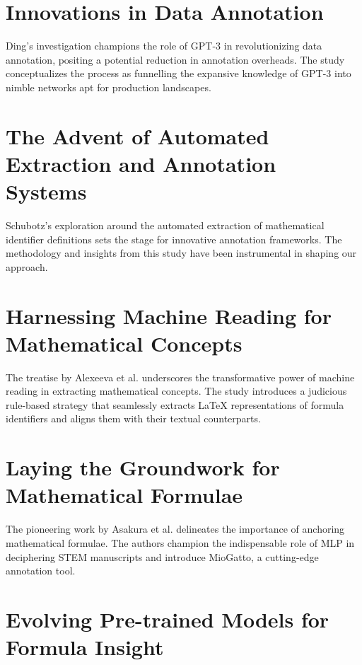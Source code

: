 \section{Innovations in Data Annotation}

Ding's investigation \parencite{ding2022gpt} champions the role of GPT-3 in revolutionizing data annotation, positing a potential reduction in annotation overheads. The study conceptualizes the process as funnelling the expansive knowledge of GPT-3 into nimble networks apt for production landscapes.

\section{The Advent of Automated Extraction and Annotation Systems}

Schubotz's exploration \parencite{schubotz2017evaluating} around the automated extraction of mathematical identifier definitions sets the stage for innovative annotation frameworks. The methodology and insights from this study have been instrumental in shaping our approach.

\section{Harnessing Machine Reading for Mathematical Concepts}

The treatise by Alexeeva et al. \parencite{alexeeva2020mathalign} underscores the transformative power of machine reading in extracting mathematical concepts. The study introduces a judicious rule-based strategy that seamlessly extracts LaTeX representations of formula identifiers and aligns them with their textual counterparts.

\section{Laying the Groundwork for Mathematical Formulae}

The pioneering work by Asakura et al. \parencite{asakura2020towards} delineates the importance of anchoring mathematical formulae. The authors champion the indispensable role of MLP in deciphering STEM manuscripts and introduce MioGatto, a cutting-edge annotation tool.

\section{Evolving Pre-trained Models for Formula Insight}


